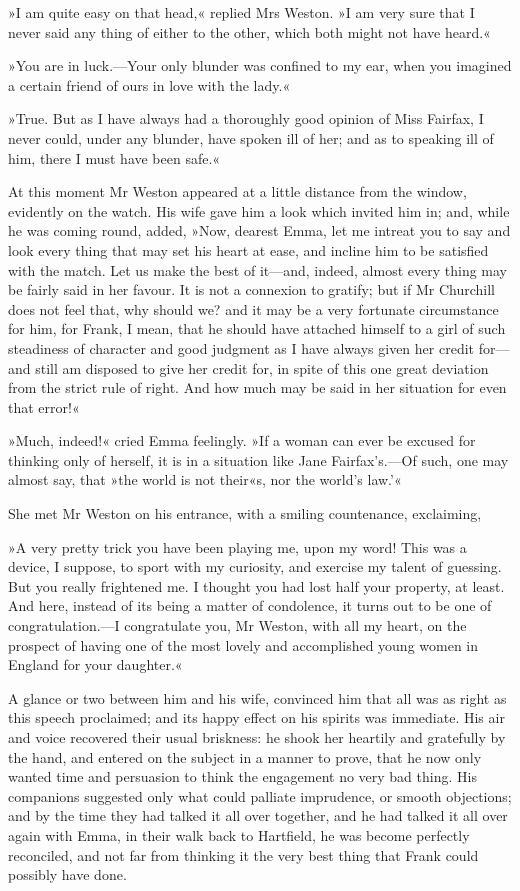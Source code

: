 »I am quite easy on that head,« replied Mrs Weston. »I am very sure that I never said any thing of either to the other, which both might not have heard.«

»You are in luck.—Your only blunder was confined to my ear, when you imagined a certain friend of ours in love with the lady.«

»True. But as I have always had a thoroughly good opinion of Miss Fairfax, I never could, under any blunder, have spoken ill of her; and as to speaking ill of him, there I must have been safe.«

At this moment Mr Weston appeared at a little distance from the window, evidently on the watch. His wife gave him a look which invited him in; and, while he was coming round, added, »Now, dearest Emma, let me intreat you to say and look every thing that may set his heart at ease, and incline him to be satisfied with the match. Let us make the best of it—and, indeed, almost every thing may be fairly said in her favour. It is not a connexion to gratify; but if Mr Churchill does not feel that, why should we? and it may be a very fortunate circumstance for him, for Frank, I mean, that he should have attached himself to a girl of such steadiness of character and good judgment as I have always given her credit for—and still am disposed to give her credit for, in spite of this one great deviation from the strict rule of right. And how much may be said in her situation for even that error!«

»Much, indeed!« cried Emma feelingly. »If a woman can ever be excused for thinking only of herself, it is in a situation like Jane Fairfax's.—Of such, one may almost say, that »the world is not their«s, nor the world's law.'«

She met Mr Weston on his entrance, with a smiling countenance, exclaiming,

»A very pretty trick you have been playing me, upon my word! This was a device, I suppose, to sport with my curiosity, and exercise my talent of guessing. But you really frightened me. I thought you had lost half your property, at least. And here, instead of its being a matter of condolence, it turns out to be one of congratulation.—I congratulate you, Mr Weston, with all my heart, on the prospect of having one of the most lovely and accomplished young women in England for your daughter.«

A glance or two between him and his wife, convinced him that all was as right as this speech proclaimed; and its happy effect on his spirits was immediate. His air and voice recovered their usual briskness: he shook her heartily and gratefully by the hand, and entered on the subject in a manner to prove, that he now only wanted time and persuasion to think the engagement no very bad thing. His companions suggested only what could palliate imprudence, or smooth objections; and by the time they had talked it all over together, and he had talked it all over again with Emma, in their walk back to Hartfield, he was become perfectly reconciled, and not far from thinking it the very best thing that Frank could possibly have done.